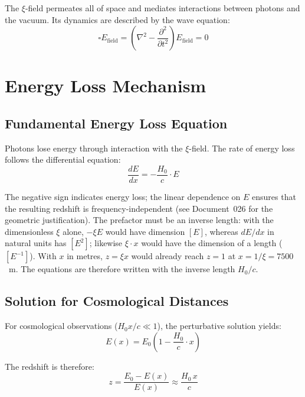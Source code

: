 	The $\xi$-field permeates all of space and mediates interactions between photons and the vacuum. Its dynamics are described by the wave equation:
	\begin{equation}
		\square E_{\text{field}} = \left(\nabla^2 - \frac{\partial^2}{\partial t^2}\right) E_{\text{field}} = 0
	\end{equation}

\section{Energy Loss Mechanism}

	\subsection{Fundamental Energy Loss Equation}

	Photons lose energy through interaction with the $\xi$-field. The rate of energy loss follows the differential equation:
	\begin{equation}
		\frac{dE}{dx} = -\frac{H_0}{c} \cdot E
	\end{equation}

	The negative sign indicates energy loss; the linear dependence on $E$ ensures that the resulting redshift is frequency-independent (see Document~026 for the geometric justification). The prefactor must be an inverse length: with the dimensionless $\xi$ alone, $-\xi E$ would have dimension $[E]$, whereas $dE/dx$ in natural units has $[E^2]$; likewise $\xi \cdot x$ would have the dimension of a length ($[E^{-1}]$). With $x$ in metres, $z = \xi x$ would already reach $z = 1$ at $x = 1/\xi = 7500$~m. The equations are therefore written with the inverse length $H_0/c$.

	\subsection{Solution for Cosmological Distances}

	For cosmological observations ($H_0 x/c \ll 1$), the perturbative solution yields:
	\begin{equation}
		E(x) = E_0 \left(1 - \frac{H_0}{c} \cdot x\right)
	\end{equation}

	The redshift is therefore:
	\begin{equation}
		z = \frac{E_0 - E(x)}{E(x)} \approx \frac{H_0\, x}{c}
	\end{equation}

